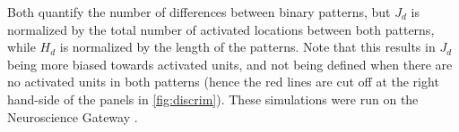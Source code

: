 Both quantify the number of differences between binary patterns,
        but $J_d$ is normalized by the total number of activated locations between both patterns,
        while $H_d$ is normalized by the length of the patterns.
    Note that this results in $J_d$ being more biased towards activated units,
        and not being defined when there are no activated units in both patterns
        (hence the red lines are cut off at the right hand-side of the panels in \autoref{fig:discrim}).
    These simulations were run on the Neuroscience Gateway \citep{Sivagnanam2013-au}.

